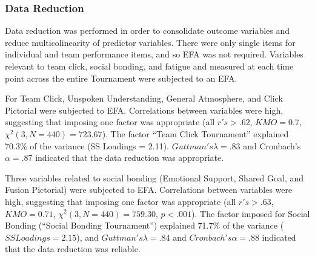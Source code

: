 









\subsubsection{Data Reduction}

Data reduction was performed in order to consolidate outcome variables and reduce multicolinearity of predictor variables. There were only single items for individual and team performance items, and so EFA was not required. Variables relevant to team click, social bonding, and fatigue and measured at each time point across the entire Tournament  were subjected to an EFA.

For Team Click, Unspoken Understanding, General Atmosphere, and Click Pictorial were subjected to EFA.  Correlations between variables were high, suggesting that imposing one factor was appropriate (all $r's > .62$, $KMO = 0.7$, $\chi^2(3, N = 440) = 723.67$).  The factor ``Team Click Tournament'' explained 70.3\% of the variance (SS Loadings = 2.11).  $Guttman's \lambda =.83$ and Cronbach's $\alpha = .87$ indicated that the data reduction was appropriate.

Three variables related to social bonding (Emotional Support, Shared Goal, and Fusion Pictorial) were subjected to EFA. Correlations between variables were high, suggesting that imposing one factor was appropriate (all $r's > .63$, $KMO = 0.71$, $\chi^2(3, N = 440) =  759.30$, $p < .001$).  The factor imposed for Social Bonding (``Social Bonding Tournament'') explained 71.7\% of the variance ($SS Loadings =  2.15$), and $Guttman's \lambda =.84$ and $Cronbach's \alpha= .88$ indicated that the data reduction was reliable.

